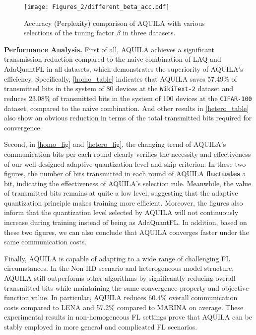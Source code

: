 \documentclass[lettersize,journal]{IEEEtran}
\begin{document}
\begin{figure*}[htbp]
    \centering
    \texttt{[image: Figures\_2/different\_beta\_acc.pdf]}
    \vspace{-8pt}
    \caption{Accuracy (Perplexity) comparison of AQUILA with various selections of the tuning factor $\beta$ in three datasets.}
    \label{beta_acc}
    \vspace{-12pt}
\end{figure*}
\textbf{Performance Analysis.} First of all, AQUILA achieves a significant transmission reduction compared to the naive combination of LAQ and AdaQuantFL in all datasets, which demonstrates the superiority of AQUILA's efficiency. Specifically, \cref{homo_table} indicates that AQUILA saves 57.49\% of transmitted bits in the system of 80 devices at the \texttt{WikiText-2} dataset and reduces 23.08\% of transmitted bits in the system of 100 devices at the \texttt{CIFAR-100} dataset, compared to the naive combination. And other results in \cref{hetero_table} also show an obvious reduction in terms of the total transmitted bits required for convergence. 

Second, in \cref{homo_fig} and \cref{hetero_fig}, the changing trend of AQUILA's communication bits per each round clearly verifies the necessity and effectiveness of our well-designed adaptive quantization level and skip criterion. In these two figures, the number of bits transmitted in each round of AQUILA \textbf{fluctuates} a bit, indicating the effectiveness of AQUILA's selection rule. Meanwhile, the value of transmitted bits remains at quite a low level, suggesting that the adaptive quantization principle makes training more efficient. Moreover, the figures also inform that the quantization level selected by AQUILA will not continuously increase during training instead of being as AdaQuantFL. In addition, based on these two figures, we can also conclude that AQUILA converges faster under the same communication costs.

Finally, AQUILA is capable of adapting to a wide range of challenging FL circumstances. In the Non-IID scenario and heterogeneous model structure, AQUILA still outperforms other algorithms by significantly reducing overall transmitted bits while maintaining the same convergence property and objective function value. In particular, AQUILA reduces 60.4\% overall communication costs compared to LENA and 57.2\% compared to MARINA on average. These experimental results in non-homogeneous FL settings prove that AQUILA can be stably employed in more general and complicated FL scenarios.
\end{document}
